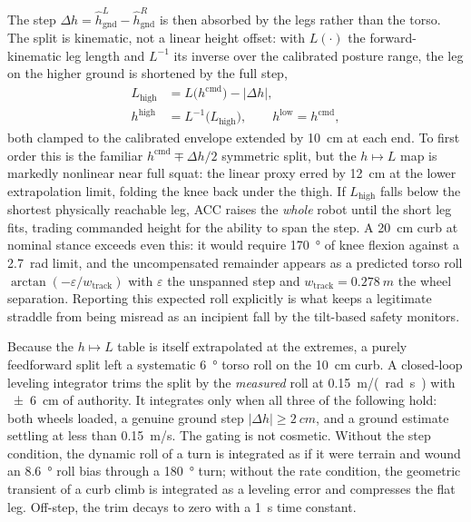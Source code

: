 \documentclass[a4paper,fleqn]{cas-dc}
\begin{document}
The step $\Delta h = \hat{h}_{\text{gnd}}^{L} - \hat{h}_{\text{gnd}}^{R}$ is
then absorbed by the legs rather than the torso. The split is kinematic, not a
linear height offset: with $L(\cdot)$ the forward-kinematic leg length and
$L^{-1}$ its inverse over the calibrated posture range, the leg on the higher
ground is shortened by the full step,
\begin{align}
L_{\text{high}} &= L\big(h^{\text{cmd}}\big) - |\Delta h|,\\
h^{\text{high}} &= L^{-1}\!\big(L_{\text{high}}\big), \qquad
h^{\text{low}} = h^{\text{cmd}},
\label{eq:terrain_split}
\end{align}
both clamped to the calibrated envelope extended by \SI{10}{cm} at each end. To
first order this is the familiar $h^{\text{cmd}} \mp \Delta h/2$ symmetric
split, but the $h \mapsto L$ map is markedly nonlinear near full squat: the
linear proxy erred by \SI{12}{cm} at the lower extrapolation limit, folding the
knee back under the thigh. If $L_{\text{high}}$ falls below the shortest
physically reachable leg, ACC raises the \emph{whole} robot until the short leg
fits, trading commanded height for the ability to span the step. A
\SI{20}{cm} curb at nominal stance exceeds even this: it would require
\SI{170}{\degree} of knee flexion against a \SI{2.7}{rad} limit, and the
uncompensated remainder appears as a predicted torso roll
$\arctan(-\varepsilon / w_{\text{track}})$ with $\varepsilon$ the unspanned
step and $w_{\text{track}} = \SI{0.278}{m}$ the wheel separation. Reporting
this expected roll explicitly is what keeps a legitimate straddle from being
misread as an incipient fall by the tilt-based safety monitors.

Because the $h \mapsto L$ table is itself extrapolated at the extremes, a
purely feedforward split left a systematic \SI{+6}{\degree} torso roll on the
\SI{10}{cm} curb. A closed-loop leveling integrator trims the split by the
\emph{measured} roll at \SI{0.15}{m/(rad.s)} with \SI{\pm 6}{cm} of authority.
It integrates only when all three of the following hold: both wheels loaded, a
genuine ground step $|\Delta h| \geq \SI{2}{cm}$, and a ground estimate settling
at less than \SI{0.15}{m/s}. The gating is not cosmetic. Without the step
condition, the dynamic roll of a turn is integrated as if it were terrain and
wound an \SI{8.6}{\degree} roll bias through a \SI{180}{\degree} turn; without
the rate condition, the geometric transient of a curb climb is integrated as a
leveling error and compresses the flat leg. Off-step, the trim decays to zero
with a \SI{1}{s} time constant.
\end{document}
